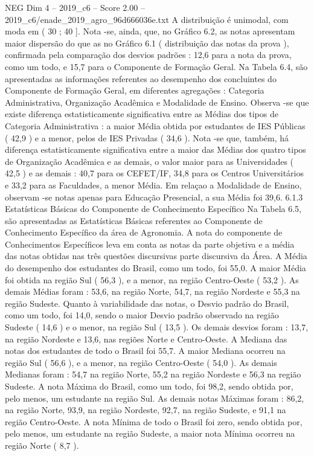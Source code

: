 \begin{textsample}{NEG Dim 4 – 2019\_c6 – Score 2.00 – 2019\_c6/enade\_2019\_agro\_96d666036e.txt}
A distribuição é unimodal, com moda em ( 30 ; 40 ].
Nota -se, ainda, que, no Gráfico 6.2, as notas apresentam maior dispersão do que as no Gráfico 6.1 ( distribuição das notas da prova ), confirmada pela comparação dos desvios padrões : 12,6 para a nota da prova, como um todo, e 15,7 para o Componente de Formação Geral.
Na Tabela 6.4, são apresentadas as informações referentes ao desempenho dos concluintes do Componente de Formação Geral, em diferentes agregações : Categoria Administrativa, Organização Acadêmica e Modalidade de Ensino.
Observa -se que existe diferença estatisticamente significativa entre as Médias dos tipos de Categoria Administrativa : a maior Média obtida por estudantes de IES Públicas ( 42,9 ) e a menor, pelos de IES Privadas ( 34,6 ).
Nota -se que, também, há diferença estatisticamente significativa entre a maior das Médias dos quatro tipos de Organização Acadêmica e as demais, o valor maior para as Universidades ( 42,5 ) e as demais : 40,7 para os CEFET/IF, 34,8 para os Centros Universitários e 33,2 para as Faculdades, a menor Média.
Em relaçao a Modalidade de Ensino, observam -se notas apenas para Educação Presencial, a sua Média foi 39,6. 6.1.3 Estatísticas Básicas do Componente de Conhecimento Específico Na Tabela 6.5, são apresentadas as Estatísticas Básicas referentes ao Componente de Conhecimento Específico da área de Agronomia.
A nota do componente de Conhecimentos Específicos leva em conta as notas da parte objetiva e a média das notas obtidas nas três questões discursivas parte discursiva da Área.
A Média do desempenho dos estudantes do Brasil, como um todo, foi 55,0.
A maior Média foi obtida na região Sul ( 56,3 ), e a menor, na região Centro-Oeste ( 53,2 ).
As demais Médias foram : 53,6, na região Norte, 54,7, na região Nordeste e 55,3 na região Sudeste.
Quanto à variabilidade das notas, o Desvio padrão do Brasil, como um todo, foi 14,0, sendo o maior Desvio padrão observado na região Sudeste ( 14,6 ) e o menor, na região Sul ( 13,5 ).
Os demais desvios foram : 13,7, na região Nordeste e 13,6, nas regiões Norte e Centro-Oeste.
A Mediana das notas dos estudantes de todo o Brasil foi 55,7.
A maior Mediana ocorreu na região Sul ( 56,6 ), e a menor, na região Centro-Oeste ( 54,0 ).
As demais Medianas foram : 54,7 na região Norte, 55,2 na região Nordeste e 56,3 na região Sudeste.
A nota Máxima do Brasil, como um todo, foi 98,2, sendo obtida por, pelo menos, um estudante na região Sul.
As demais notas Máximas foram : 86,2, na região Norte, 93,9, na região Nordeste, 92,7, na região Sudeste, e 91,1 na região Centro-Oeste.
A nota Mínima de todo o Brasil foi zero, sendo obtida por, pelo menos, um estudante na região Sudeste, a maior nota Mínima ocorreu na região Norte ( 8,7 ).

\end{textsample}
